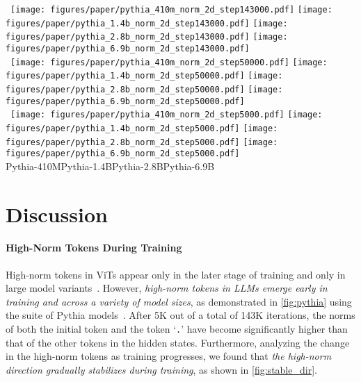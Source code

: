 \begin{figure*}[t]
    \centering
    ~\texttt{[image: figures/paper/pythia\_410m\_norm\_2d\_step143000.pdf]}
    \texttt{[image: figures/paper/pythia\_1.4b\_norm\_2d\_step143000.pdf]}
    \texttt{[image: figures/paper/pythia\_2.8b\_norm\_2d\_step143000.pdf]}
    \texttt{[image: figures/paper/pythia\_6.9b\_norm\_2d\_step143000.pdf]}\\
    ~\texttt{[image: figures/paper/pythia\_410m\_norm\_2d\_step50000.pdf]}
    \texttt{[image: figures/paper/pythia\_1.4b\_norm\_2d\_step50000.pdf]}
    \texttt{[image: figures/paper/pythia\_2.8b\_norm\_2d\_step50000.pdf]}
    \texttt{[image: figures/paper/pythia\_6.9b\_norm\_2d\_step50000.pdf]}\\
    ~\texttt{[image: figures/paper/pythia\_410m\_norm\_2d\_step5000.pdf]}
    \texttt{[image: figures/paper/pythia\_1.4b\_norm\_2d\_step5000.pdf]}
    \texttt{[image: figures/paper/pythia\_2.8b\_norm\_2d\_step5000.pdf]}
    \texttt{[image: figures/paper/pythia\_6.9b\_norm\_2d\_step5000.pdf]}\\
    {\tiny\qquad Pythia-410M\qquad\qquad\qquad\qquad\qquad\qquad\qquad\quad Pythia-1.4B\qquad\qquad\qquad\qquad\qquad\qquad\qquad\quad Pythia-2.8B\qquad\qquad\qquad\qquad\qquad\qquad\qquad\quad Pythia-6.9B}
    \vspace{-0.5em}
    \caption{High norm tokens in the Pythia model suite.
    Each row shows a different training iteration, with the top row being the final state at 143K iteration.
    Each column is a different model size, including 410M, 1.4B, 2.8B, and 6.9B\@.
    }\label{fig:pythia}
    \vspace{-1em}
\end{figure*}

\section{Discussion}\label{sec:discussion}

\paragraph{High-Norm Tokens During Training}

High-norm tokens in ViTs appear only in the later stage of training and only in large model variants~\cite{darcetvision}.
However, \emph{high-norm tokens in LLMs emerge early in training and across a variety of model sizes}, as demonstrated in \cref{fig:pythia} using the suite of Pythia models~\cite{biderman2023pythia}.
After 5K out of a total of 143K iterations, the norms of both the initial token and the token `\texttt{.}' have become significantly higher than that of the other tokens in the hidden states.
Furthermore, analyzing the change in the high-norm tokens as training progresses, we found that \emph{the high-norm direction gradually stabilizes during training}, as shown in \cref{fig:stable_dir}.

